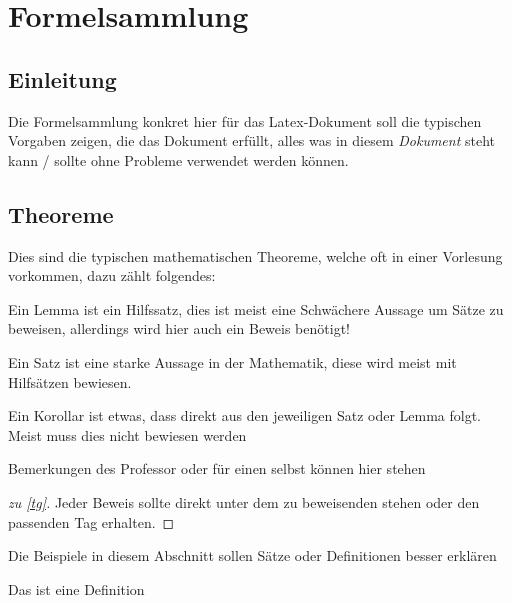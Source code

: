 \section{Formelsammlung}
\subsection*{Einleitung}
Die Formelsammlung konkret hier für das Latex-Dokument soll die typischen Vorgaben zeigen, die das Dokument erfüllt, alles was in diesem \textit{Dokument} steht kann / sollte ohne Probleme verwendet werden können. 

\subsection{Theoreme}
Dies sind die typischen mathematischen Theoreme, welche oft in einer Vorlesung vorkommen, dazu zählt folgendes:
\begin{lem}
	Ein Lemma ist ein Hilfssatz, dies ist meist eine Schwächere Aussage um Sätze zu beweisen, allerdings wird hier auch ein Beweis benötigt! 
\end{lem}
 
\begin{thm} \label{tg}%
	Ein Satz ist eine starke Aussage in der Mathematik, diese wird meist mit Hilfsätzen bewiesen.
\end{thm}

\begin{cor}
Ein Korollar ist etwas, dass direkt aus den jeweiligen Satz oder Lemma folgt. Meist muss dies nicht bewiesen werden
\end{cor}

\begin{note}

	Bemerkungen des Professor oder für einen selbst können hier stehen

\end{note}

\begin{proof}[zu \ref{tg}]

Jeder Beweis sollte direkt unter dem zu beweisenden stehen oder den passenden Tag erhalten.

\end{proof}

\begin{example}[Beispiel]

	Die Beispiele in diesem Abschnitt sollen Sätze oder Definitionen besser erklären

\end{example}
\begin{df}[Definition]

Das ist eine Definition

\end{df}

